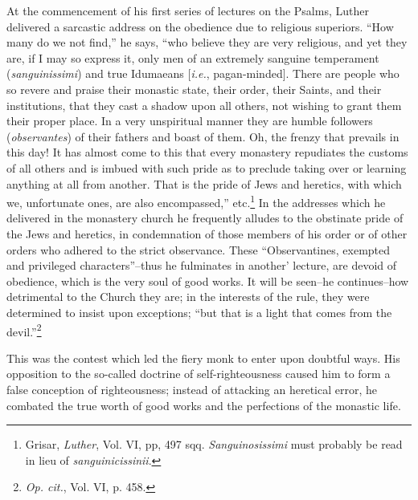 At the commencement of his first series of lectures on the Psalms, Luther
delivered a sarcastic address on the obedience due to religious superiors.
“How many do we not find,” he says, “who believe they are very religious,
and yet they are, if I may so express it, only men of an extremely
sanguine temperament (\textit{sanguinissimi}) and true Idumaeans [\textit{i.e.}, pagan-minded].
There are people who so revere and praise their monastic
state, their order, their Saints, and their institutions, that they cast a
shadow upon all others, not wishing to grant them their proper place.
In a very unspiritual manner they are humble followers (\textit{observantes}) of their
fathers and boast of them. Oh, the frenzy that prevails in this day! It has
almost come to this that every monastery repudiates the customs of all
others and is imbued with such pride as to preclude taking over or learning
anything at all from another. That is the pride of Jews and heretics,
with which we, unfortunate ones, are also encompassed,” etc.\footnote
{Grisar, \textit{Luther}, Vol. VI, pp, 497 sqq. \textit{Sanguinosissimi} must probably be read in lieu of
\textit{sanguinicissinii}.}
In the addresses which he delivered in the monastery church he frequently
alludes to the obstinate pride of the Jews and heretics, in condemnation of
those members of his order or of other orders who adhered to the strict
observance. These “Observantines, exempted and privileged characters”--thus he
fulminates in another’ lecture, are devoid of obedience, which is the very
soul of good works. It will be seen--he continues--how detrimental to the
Church they are; in the interests of the rule, they were determined to
insist upon exceptions; “but that is a light that comes from the devil.”\footnote
{\textit{\textit{Op. cit.}}, Vol. VI, p. 458.}

This was the contest which led the fiery monk to enter upon
doubtful ways. His opposition to the so-called doctrine of self-righteousness
caused him to form a false conception of righteousness;
instead of attacking an heretical error, he combated the true worth
of good works and the perfections of the monastic life.

